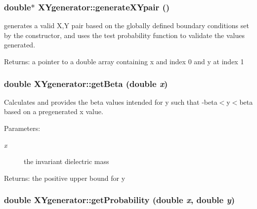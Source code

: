 \subsubsection{\setlength{\rightskip}{0pt plus 5cm}double$\ast$ XYgenerator::generate\-XYpair ()}\label{classXYgenerator_5d076b34cbf9e0686ee9d31d7cc652d5}


generates a valid X,Y pair based on the globally defined boundary conditions set by the constructor, and uses the test probability function to validate the values generated. 

\begin{Desc}
\item[Returns:]a pointer to a double array containing x and index 0 and y at index 1 \end{Desc}
\subsubsection{\setlength{\rightskip}{0pt plus 5cm}double XYgenerator::get\-Beta (double {\em x})\hspace{0.3cm}{\tt  [private]}}\label{classXYgenerator_c6a399d5002a19768f9aaea32054861c}


Calculates and provides the beta values intended for y such that -beta$<$y$<$beta based on a pregenerated x value. 

\begin{Desc}
\item[Parameters:]
\begin{description}
\item[{\em x}]the invariant dielectric mass \end{description}
\end{Desc}
\begin{Desc}
\item[Returns:]the positive upper bound for y \end{Desc}
\subsubsection{\setlength{\rightskip}{0pt plus 5cm}double XYgenerator::get\-Probability (double {\em x}, double {\em y})\hspace{0.3cm}{\tt  [private]}}\label{classXYgenerator_a509cc8132ab8e7ae3d42e48ed7890f8}


